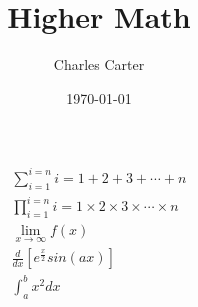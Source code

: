 \documentclass{article}
\title{Higher Math}
\author{Charles Carter}
\date{\today{}}
\begin{document}
 
    \maketitle{}
		\begin{gather}
			\sum_{i=1}^{i=n} i = 1 + 2 + 3 + \dotsm{} + n \\
			\prod_{i=1}^{i=n} i = 1 \times 2 \times 3 \times \dotsm{} \times n \\
			\lim_{x \to \infty} f(x) \label{higher:lim} \\
			\frac{d}{dx} \left[ e^\frac{x}{2} sin(ax)\right] \\
			\int_{a}^{b} x^2 dx
		\end{gather}
\end{document}
